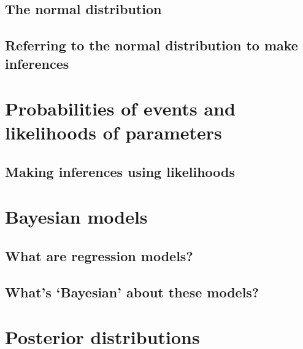\documentclass[
]{book}
\begin{document}
\hypertarget{the-normal-distribution}{%
\subsection{The normal distribution}\label{the-normal-distribution}}

\hypertarget{referring-to-the-normal-distribution-to-make-inferences}{%
\subsection{Referring to the normal distribution to make inferences}\label{referring-to-the-normal-distribution-to-make-inferences}}

\hypertarget{probabilities-of-events-and-likelihoods-of-parameters}{%
\section{Probabilities of events and likelihoods of parameters}\label{probabilities-of-events-and-likelihoods-of-parameters}}

\hypertarget{making-inferences-using-likelihoods}{%
\subsection{Making inferences using likelihoods}\label{making-inferences-using-likelihoods}}

\hypertarget{bayesian-models}{%
\section{Bayesian models}\label{bayesian-models}}

\hypertarget{what-are-regression-models}{%
\subsection{What are regression models?}\label{what-are-regression-models}}

\hypertarget{whats-bayesian-about-these-models}{%
\subsection{What's `Bayesian' about these models?}\label{whats-bayesian-about-these-models}}

\hypertarget{posterior-distributions}{%
\section{Posterior distributions}\label{posterior-distributions}}
\end{document}
